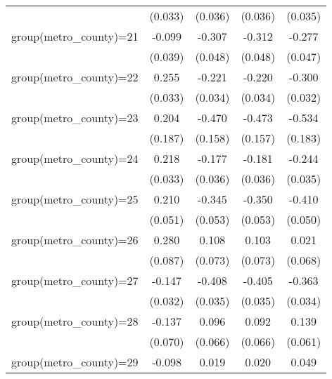 {\begin{tabular}{l*{4}{c}}
                    &     (0.033)         &     (0.036)         &     (0.036)         &     (0.035)         \\
group(metro\_county)=21&      -0.099\sym{**} &      -0.307\sym{***}&      -0.312\sym{***}&      -0.277\sym{***}\\
                    &     (0.039)         &     (0.048)         &     (0.048)         &     (0.047)         \\
group(metro\_county)=22&       0.255\sym{***}&      -0.221\sym{***}&      -0.220\sym{***}&      -0.300\sym{***}\\
                    &     (0.033)         &     (0.034)         &     (0.034)         &     (0.032)         \\
group(metro\_county)=23&       0.204         &      -0.470\sym{***}&      -0.473\sym{***}&      -0.534\sym{***}\\
                    &     (0.187)         &     (0.158)         &     (0.157)         &     (0.183)         \\
group(metro\_county)=24&       0.218\sym{***}&      -0.177\sym{***}&      -0.181\sym{***}&      -0.244\sym{***}\\
                    &     (0.033)         &     (0.036)         &     (0.036)         &     (0.035)         \\
group(metro\_county)=25&       0.210\sym{***}&      -0.345\sym{***}&      -0.350\sym{***}&      -0.410\sym{***}\\
                    &     (0.051)         &     (0.053)         &     (0.053)         &     (0.050)         \\
group(metro\_county)=26&       0.280\sym{***}&       0.108         &       0.103         &       0.021         \\
                    &     (0.087)         &     (0.073)         &     (0.073)         &     (0.068)         \\
group(metro\_county)=27&      -0.147\sym{***}&      -0.408\sym{***}&      -0.405\sym{***}&      -0.363\sym{***}\\
                    &     (0.032)         &     (0.035)         &     (0.035)         &     (0.034)         \\
group(metro\_county)=28&      -0.137\sym{*}  &       0.096         &       0.092         &       0.139\sym{**} \\
                    &     (0.070)         &     (0.066)         &     (0.066)         &     (0.061)         \\
group(metro\_county)=29&      -0.098\sym{**} &       0.019         &       0.020         &       0.049         \\

\end{tabular}}
